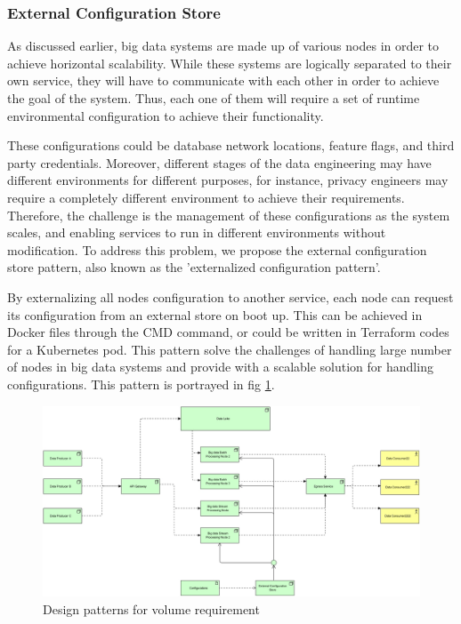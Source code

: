 \documentclass[conference]{IEEEtran}
\begin{document}
\subsubsection{External Configuration Store}

As discussed earlier, big data systems are made up of various nodes in order to achieve horizontal scalability. While these systems are logically separated to their own service, they will have to communicate with each other in order to achieve the goal of the system. Thus, each one of them will require a set of runtime environmental configuration to achieve their functionality. 

These configurations could be database network locations, feature flags, and third party credentials. Moreover, different stages of the data engineering may have different environments for different purposes, for instance, privacy engineers may require a completely different environment to achieve their requirements. Therefore, the challenge is the management of these configurations as the system scales, and enabling services to run in different environments without modification. To address this problem, we propose the external configuration store pattern, also known as the 'externalized configuration pattern'. 

By externalizing all nodes configuration to another service, each node can request its configuration from an external store on boot up. This can be achieved in Docker files through the CMD command, or could be written in Terraform codes for a Kubernetes pod. This pattern solve the challenges of handling large number of nodes in big data systems and provide with a scalable solution for handling configurations. This pattern is portrayed in fig \ref{fig:vol}.

\begin{figure}[h]
    \centering 
    \includegraphics[width=17cm]{../Media/Vol-1 Requirement RA.jpg}
    \caption{Design patterns for volume requirement}
    \label{fig:vol}
\end{figure}
\end{document}
